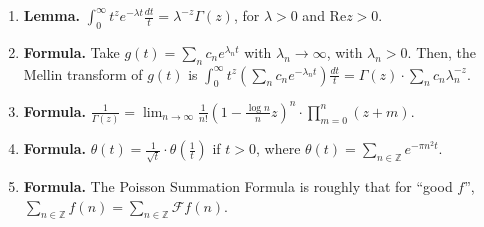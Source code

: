 \begin{enumerate}
	\item \textbf{Lemma. } $\int_{0}^{\infty} t^z e^{-\lambda t} \frac{dt}{t} = \lambda^{-z} \Gamma(z)$, for $\lambda>0$ and $\textrm{Re}z>0$. 
	\item \textbf{Formula. } Take $g(t) = \sum_n c_n e^{\lambda_n t}$ with $\lambda_n \to \infty$, with $\lambda_n > 0$. Then, the Mellin transform of $g(t)$ is $\int_{0}^{\infty} t^z (\sum_n c_n e^{-\lambda_n t}) \frac{dt}{t} = \Gamma(z) \cdot \sum_n c_n \lambda_n^{-z}$. 
	\item \textbf{Formula. } $\frac{1}{\Gamma(z)} = \lim_{n \to \infty} \frac{1}{n!} \left(1 - \frac{\log n}{n}z\right)^n \cdot \prod_{m=0}^n (z+m)$. 
	\item \textbf{Formula. } $\theta(t) = \frac{1}{\sqrt{t}} \cdot \theta(\frac{1}{t})$ if $t>0$, where $\theta(t) = \sum_{n \in \mathbb{Z}} e^{-\pi n^2 t}$. 
	\item \textbf{Formula. } The Poisson Summation Formula is roughly that for \enquote{good $f$}, $\sum_{n \in \mathbb{Z}} f(n) = \sum_{n \in \mathbb{Z}} \mathscr{F}f(n)$. 
\end{enumerate}  
 

